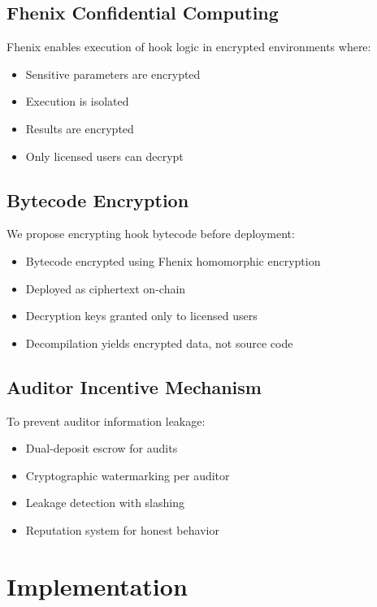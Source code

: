 \documentclass[11pt,a4paper]{article}
\theoremstyle{definition}
\theoremstyle{remark}
\begin{document}
\subsection{Fhenix Confidential Computing}

Fhenix enables execution of hook logic in encrypted environments where:
\begin{itemize}
    \item Sensitive parameters are encrypted
    \item Execution is isolated
    \item Results are encrypted
    \item Only licensed users can decrypt
\end{itemize}

\subsection{Bytecode Encryption}

We propose encrypting hook bytecode before deployment:
\begin{itemize}
    \item Bytecode encrypted using Fhenix homomorphic encryption
    \item Deployed as ciphertext on-chain
    \item Decryption keys granted only to licensed users
    \item Decompilation yields encrypted data, not source code
\end{itemize}

\subsection{Auditor Incentive Mechanism}

To prevent auditor information leakage:
\begin{itemize}
    \item Dual-deposit escrow for audits
    \item Cryptographic watermarking per auditor
    \item Leakage detection with slashing
    \item Reputation system for honest behavior
\end{itemize}


\section{Implementation}
\label{sec:implementation}
\end{document}
